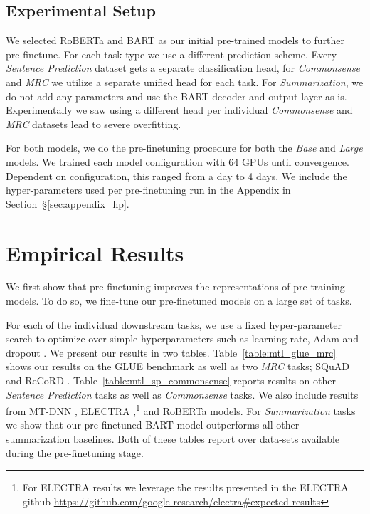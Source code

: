 \documentclass[11pt,a4paper]{article}
\begin{document}
\subsection{Experimental Setup}
We selected RoBERTa \citep{ROBERTA} and BART \citep{BART} as our initial pre-trained models to further pre-finetune. For each task type we use a different prediction scheme.
Every \textit{Sentence Prediction} dataset gets a separate classification head, for \textit{Commonsense} and \textit{MRC} we utilize a separate unified head for each task. For \textit{Summarization}, we do not add any parameters and use the BART decoder and output layer as is. Experimentally we saw using a different head per individual \textit{Commonsense} and \textit{MRC} datasets lead to severe overfitting. 

For both models, we do the pre-finetuning procedure for both the \textit{Base} and \textit{Large} models. We trained each model configuration with 64 GPUs until convergence. Dependent on configuration, this ranged from a day to 4 days. We include the hyper-parameters used per pre-finetuning run in the Appendix in Section~\S\ref{sec:appendix_hp}.

\section{Empirical Results}
\label{sec:empirical_results}
We first show that pre-finetuning improves the representations of pre-training models. To do so, we fine-tune our pre-finetuned models on a large set of tasks. 

For each of the individual downstream tasks, we use a fixed hyper-parameter search to optimize over simple hyperparameters such as learning rate, Adam  \citep{ADAM} and dropout \citep{DROPOUT}. We present our results in two tables. Table~\ref{table:mtl_glue_mrc} shows our results on the GLUE benchmark \citep{GLUE} as well as two \textit{MRC} tasks; SQuAD \citep{SQUAD} and ReCoRD \citep{RECORD}. Table~\ref{table:mtl_sp_commonsense} reports results on other \textit{Sentence Prediction} tasks as well as \textit{Commonsense} tasks. We also include results from MT-DNN \cite{MT_DNN}, ELECTRA \cite{ELECTRA},\footnote{For ELECTRA results we leverage the results presented in the ELECTRA github \url{https://github.com/google-research/electra\#expected-results}} and RoBERTa \cite{ROBERTA} models. For \textit{Summarization} tasks we show that our pre-finetuned BART model outperforms all other summarization baselines. Both of these tables report over data-sets available during the pre-finetuning stage.
\end{document}
